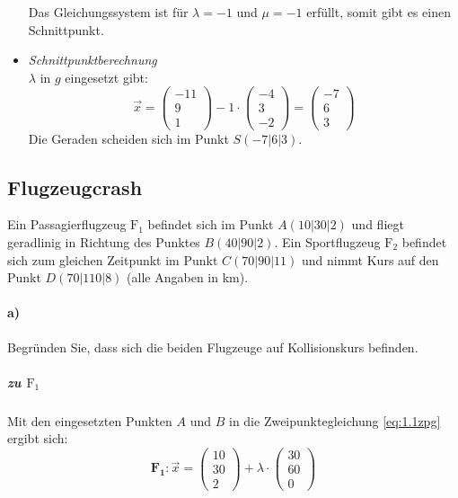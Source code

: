 \documentclass{ajc}
\numberwithin{equation}{subsection}
\begin{document}
\begin{itemize}
		Das Gleichungssystem ist für $\lambda = -1$ und $\mu = -1$ erfüllt, somit gibt es einen Schnittpunkt. \\
		\item \textit{Schnittpunktberechnung} \\
		$\lambda$ in $g$ eingesetzt gibt: 
		\begin{equation}
			\overrightarrow{x}=\left(\begin{array}{r} -11 \\ 9 \\ 1\end{array}\right) -1 \cdot \left(\begin{array}{r} -4 \\ 3 \\ -2\end{array}\right) = \left(\begin{array}{r} -7 \\ 6 \\ 3\end{array}\right)
		\end{equation}
		Die Geraden scheiden sich im Punkt $S(-7|6|3)$.
	\end{itemize}
	
	\subsection{Flugzeugcrash}
	Ein Passagierflugzeug $\text{F}_1$ befindet sich im Punkt  $A(10|30|2)$ und fliegt geradlinig in Richtung des Punktes $B(40|90|2)$. Ein Sportflugzeug $\text{F}_2$ befindet sich zum gleichen Zeitpunkt im Punkt $C(70|90|11)$ und nimmt Kurs auf den Punkt $D(70|110|8)$ (alle Angaben in km).
	
	\paragraph{a)} Begründen Sie, dass sich die beiden Flugzeuge auf Kollisionskurs befinden.
	
	\subparagraph{zu $\text{F}_1$} Mit den eingesetzten Punkten $A$ und $B$ in die Zweipunktegleichung \ref{eq:1.1zpg} ergibt sich: 
	\begin{equation}
		\mathbf{F_1}: \overrightarrow{x}=\left(\begin{array}{r} 10 \\ 30 \\ 2\end{array}\right) + \lambda \cdot \left(\begin{array}{r} 30 \\ 60 \\ 0\end{array}\right)
	\end{equation}
	
\end{document}
